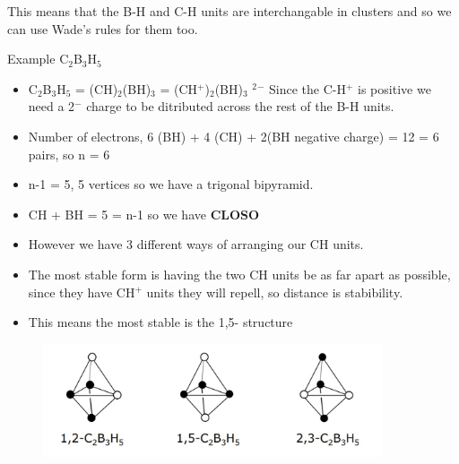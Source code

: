 \documentclass{article}
\renewcommand{\sup}[1]{\(^#1\)}
\newcommand{\sub}[1]{\(_#1\)}
\begin{document}
    This means that the B-H and C-H units are interchangable in clusters and so we can use Wade's rules for them too. 

    Example C\sub{2}B\sub{3}H\sub{5}

    \begin{itemize}
        \item C\sub{2}B\sub{3}H\sub{5} = (CH)\sub{2}(BH)\sub{3} = (CH\sup{+})\sub{2}(BH)\sub{3} \sup{2}\sup{-} Since the C-H\sup{+} is positive we need a 2\sup{-} charge to be ditributed across the rest of the B-H units.
        \item Number of electrons, 6 (BH) + 4 (CH) + 2(BH negative charge) = 12 = 6 pairs, so n = 6
        \item n-1 = 5, 5 vertices so we have a trigonal bipyramid.
        \item CH + BH = 5 = n-1 so we have \textbf{CLOSO}
        \item However we have 3 different ways of arranging our CH units.
        \item The most stable form is having the two CH units be as far apart as possible, since they have CH\sup{+} units they will repell, so distance is stabibility.
        \item This means the most stable is the 1,5- structure 
    \end{itemize}

    \begin{figure}[h]
        \centering
        \includegraphics[width=10cm]{1-5.jpg}
    \end{figure}
    
\end{document}
